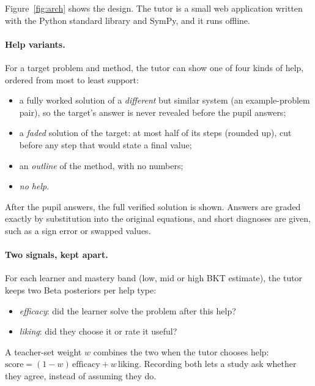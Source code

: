 \documentclass[11pt,a4paper]{article}
\begin{document}
Figure~\ref{fig:arch} shows the design. The tutor is a small web application written with
the Python standard library and SymPy, and it runs offline.

\paragraph{Help variants.}
For a target problem and method, the tutor can show one of four kinds of help, ordered from
most to least support:
\begin{itemize}
  \item a fully worked solution of a \emph{different} but similar system (an example-problem
        pair), so the target's answer is never revealed before the pupil answers;
  \item a \emph{faded} solution of the target: at most half of its steps (rounded up), cut
        before any step that would state a final value;
  \item an \emph{outline} of the method, with no numbers;
  \item \emph{no help}.
\end{itemize}
After the pupil answers, the full verified solution is shown. Answers are graded exactly by
substitution into the original equations, and short diagnoses are given, such as a sign
error or swapped values.

\paragraph{Two signals, kept apart.}
For each learner and mastery band (low, mid or high BKT estimate), the tutor keeps two Beta
posteriors per help type:
\begin{itemize}
  \item \emph{efficacy}: did the learner solve the problem after this help?
  \item \emph{liking}: did they choose it or rate it useful?
\end{itemize}
A teacher-set weight $w$ combines the two when the tutor chooses help:
$\text{score} = (1-w)\,\text{efficacy} + w\,\text{liking}$. Recording both lets a study ask
whether they agree, instead of assuming they do.
\end{document}
